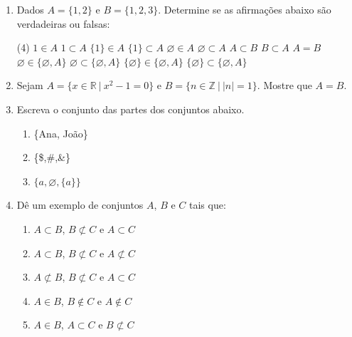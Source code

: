 \documentclass[a4paper,5pt]{amsbook}
\begin{document}
\vspace{1cm}
\begin{enumerate}
    \vspace{0.5cm}
    \item Dados $A=\{1,2\}$ e $B=\{1,2,3\}$. Determine se as afirma\c{c}\~oes abaixo
        s\~ao verdadeiras ou falsas:
        \begin{tasks}[style=enumerate, counter-format={(tsk[a])}, label-offset={0.25cm}](4)
            \task $1\in A$
            \task $1\subset A$
            \task $\{1\}\in A$
            \task $\{1\}\subset A$
            \task $\varnothing \in A$
            \task $\varnothing \subset A$
            \task $A\subset B$
            \task $B\subset A$
            \task $A=B$
            \task $\varnothing\in\{\varnothing, A\}$
            \task $\varnothing\subset\{\varnothing, A\}$
            \task $\{\varnothing\}\in\{\varnothing, A\}$
            \task $\{\varnothing\}\subset\{\varnothing, A\}$
        \end{tasks}

    \vspace{0.5cm}
    \item Sejam $A=\{x\in\mathbb{R}\ |\ x^2-1=0\}$ e $B=\{n\in\mathbb{Z}\ |\
        |n|=1\}$. Mostre que $A=B$.

    \vspace{0.5cm}
    \item Escreva o conjunto das partes dos conjuntos abaixo.
        \begin{enumerate}
            \setlength\itemsep{0.2cm}
            \item \{Ana, Jo\~ao\}
            \item \{\$,\#,\&\}
            \item $\{a, \varnothing, \{a\}\}$
        \end{enumerate}

    \vspace{0.5cm}
    \item D\^e um exemplo de conjuntos $A$, $B$ e $C$ tais que:
        \begin{enumerate}
            \setlength\itemsep{0.2cm}
            \item $A\subset B$, $B\not\subset C$ e $A\subset C$
            \item $A\subset B$, $B\not\subset C$ e $A\not\subset C$
            \item $A\not\subset B$, $B\not\subset C$ e $A\subset C$
            \item $A\in B$, $B\not\in C$ e $A\not\in C$
            \item $A\in B$, $A\subset C$ e $B\not\subset C$
        \end{enumerate}
\end{enumerate}
\end{document}
